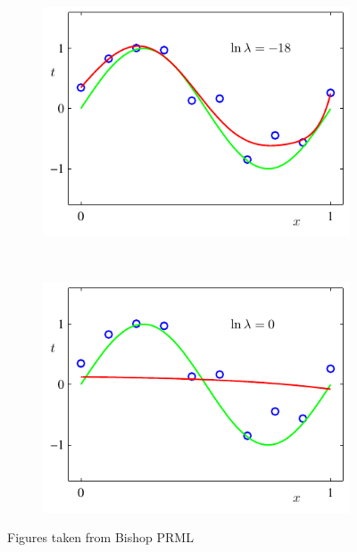 \begin{figure}
	\centering
	\begin{subfigure}[b]{0.45\textwidth}
                \centering
                \includegraphics[width=\textwidth]{./lecture1/Figure1_7a}
    \end{subfigure}%
	~
	\begin{subfigure}[b]{0.45\textwidth}
                \centering
                \includegraphics[width=\textwidth]{./lecture1/Figure1_7b}
    \end{subfigure}%
	\caption{Figures taken from Bishop PRML}
\end{figure}


